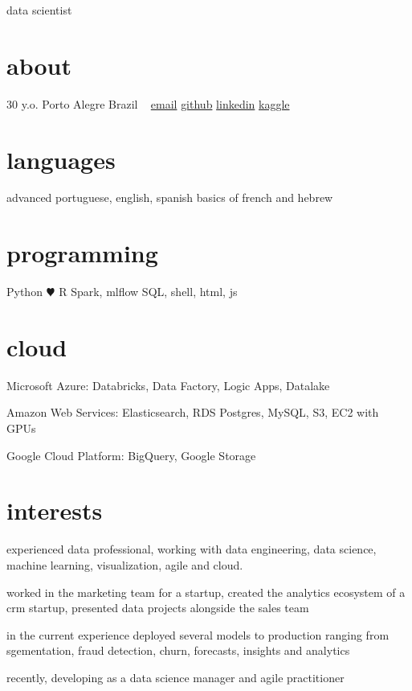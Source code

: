 \documentclass[]{friggeri-cv}
\begin{document}
       {data scientist}


\begin{aside}
  \section{about}
    30 y.o.
    Porto Alegre
    Brazil
    ~
    \href{mailto:jayme.anchante@disroot.com}{email}
    \href{https://github.com/jaymeanchante/}{github}
    \href{https://www.linkedin.com/in/jaymeanchante}{linkedin}
    \href{https://www.kaggle.com/jaymeanchante}{kaggle}
  \section{languages}
    advanced portuguese, english, spanish
    basics of french and hebrew
  \section{programming}
    Python {\color{red} $\varheartsuit$} R
    Spark, mlflow
    SQL, shell, html, js
  \section{cloud}
    \hfill \break Microsoft Azure:
    Databricks, Data Factory, Logic
    Apps, Datalake
    
    \hfill \break Amazon Web Services:
    Elasticsearch, RDS Postgres, MySQL,
    S3, EC2 with GPUs
    
    \hfill \break Google Cloud Platform:
    BigQuery, Google Storage
\end{aside}

\section{interests}

experienced data professional, working with data engineering, data science,
machine learning, visualization, agile and cloud.

worked in the marketing team for a startup, created the analytics ecosystem
of a crm startup, presented data projects alongside the sales team

in the current experience deployed several models to production ranging from
sgementation, fraud detection, churn, forecasts, insights and analytics

recently, developing as a data science manager and agile practitioner
\end{document}
